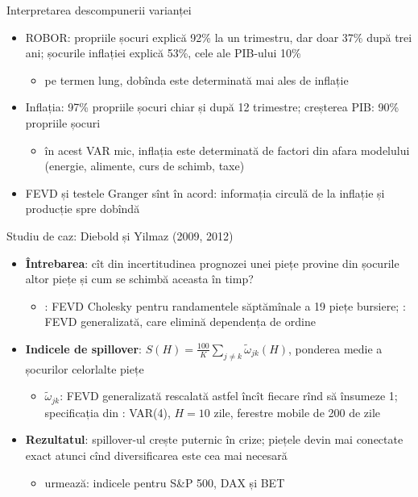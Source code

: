 \begin{frame}{Interpretarea descompunerii varianței}
\itemsize{\small}
\begin{itemize}
    \item ROBOR: propriile șocuri explică 92\% la un trimestru, dar doar 37\% după trei ani; șocurile inflației explică 53\%, cele ale PIB-ului 10\%
    \begin{itemize}
        \item pe termen lung, dobînda este determinată mai ales de inflație
    \end{itemize}
    \item Inflația: 97\% propriile șocuri chiar și după 12 trimestre; creșterea PIB: 90\% propriile șocuri
    \begin{itemize}
        \item în acest VAR mic, inflația este determinată de factori din afara modelului (energie, alimente, curs de schimb, taxe)
    \end{itemize}
    \item FEVD și testele Granger sînt în acord: informația circulă de la inflație și producție spre dobîndă
\end{itemize}
\end{frame}

\begin{frame}{Studiu de caz: Diebold și Yilmaz (2009, 2012)}
\itemsize{\small}
\begin{itemize}
    \item \textbf{Întrebarea}: cît din incertitudinea prognozei unei piețe provine din șocurile altor piețe și cum se schimbă aceasta în timp?
    \begin{itemize}
        \item {}: FEVD Cholesky pentru randamentele săptămînale a 19 piețe bursiere; : FEVD generalizată, care elimină dependența de ordine
    \end{itemize}
    \item \textbf{Indicele de spillover}: $S(H) = \frac{100}{K}\sum_{j \ne k}\tilde\omega_{jk}(H)$, ponderea medie a șocurilor celorlalte piețe
    \begin{itemize}
        \item $\tilde\omega_{jk}$: FEVD generalizată rescalată astfel încît fiecare rînd să însumeze 1; specificația din : VAR(4), $H = 10$ zile, ferestre mobile de 200 de zile
    \end{itemize}
    \item \textbf{Rezultatul}: spillover-ul crește puternic în crize; piețele devin mai conectate exact atunci cînd diversificarea este cea mai necesară
    \begin{itemize}
        \item urmează: indicele pentru S\&P 500, DAX și BET
    \end{itemize}
\end{itemize}
\end{frame}

